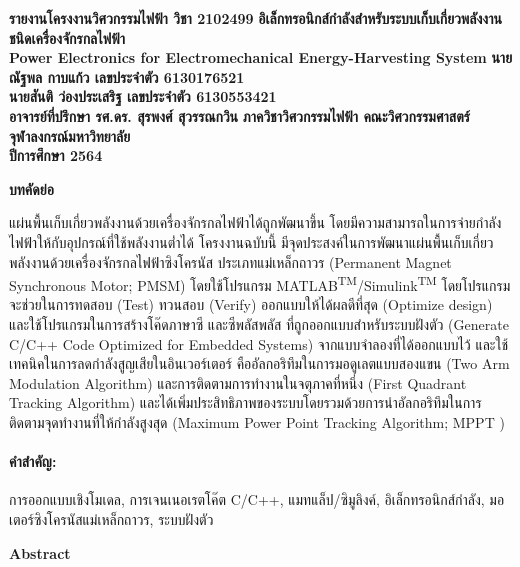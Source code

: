 \documentclass[11pt,a4paper]{article}
\begin{document}
\thispagestyle{empty}
\begin{center}
    \doublespacing
    {\LARGE \bf รายงานโครงงานวิศวกรรมไฟฟ้า วิชา 2102499}
    \vfill
    {
        \LARGE \bf
        อิเล็กทรอนิกส์กำลังสำหรับระบบเก็บเกี่ยวพลังงานชนิดเครื่องจักรกลไฟฟ้า \\[2ex]
        Power Electronics for Electromechanical Energy-Harvesting System
    }
    \vfill
    {\LARGE \bf นายณัฐพล กาบแก้ว เลขประจำตัว 6130176521}\\[2ex]
    {\LARGE \bf นายสันติ ว่องประเสริฐ เลขประจำตัว 6130553421}\\[2ex]
    {\LARGE \bf อาจารย์ที่ปรึกษา รศ.ดร. สุรพงศ์ สุวรรณกวิน}
    \vfill
    {\LARGE \bf ภาควิชาวิศวกรรมไฟฟ้า คณะวิศวกรรมศาสตร์}\\[2ex]
    {\LARGE \bf จุฬาลงกรณ์มหาวิทยาลัย}\\[2ex]
    {\LARGE \bf ปีการศึกษา 2564}
\end{center}

\newpage
\thispagestyle{empty}
\begin{center}
    \textbf{บทคัดย่อ}
\end{center}

แผ่นพื้นเก็บเกี่ยวพลังงานด้วยเครื่องจักรกลไฟฟ้าได้ถูกพัฒนาขึ้น โดยมีความสามารถในการจ่ายกำลังไฟฟ้าให้กับอุปกรณ์ที่ใช้พลังงานต่ำได้ โครงงานฉบับนี้ มีจุดประสงค์ในการพัฒนาแผ่นพื้นเก็บเกี่ยวพลังงานด้วยเครื่องจักรกลไฟฟ้าซิงโครนัส ประเภทแม่เหล็กถาวร (Permanent Magnet Synchronous Motor; PMSM) โดยใช้โปรแกรม MATLAB\textsuperscript{TM}/Simulink\textsuperscript{TM} โดยโปรแกรม จะช่วยในการทดสอบ (Test) ทวนสอบ (Verify) ออกแบบให้ได้ผลดีที่สุด (Optimize design) และใช้โปรแกรมในการสร้างโค๊ดภาษาซี และซีพลัสพลัส ที่ถูกออกแบบสำหรับระบบฝังตัว (Generate C/C++ Code Optimized for Embedded Systems)  จากแบบจำลองที่ได้ออกแบบไว้ และใช้เทคนิคในการลดกำลังสูญเสียในอินเวอร์เตอร์ คืออัลกอริทึมในการมอดูเลตแบบสองแขน (Two Arm Modulation Algorithm) และการติดตามการทำงานในจตุภาคที่หนึ่ง (First Quadrant Tracking Algorithm) และได้เพิ่มประสิทธิภาพของระบบโดยรวมด้วยการนำอัลกอริทึมในการติดตามจุดทำงานที่ให้กำลังสูงสุด (Maximum Power Point Tracking Algorithm; MPPT )

\paragraph{\textbf คำสำคัญ:} การออกแบบเชิงโมเดล, การเจนเนอเรตโค๊ต C/C++, แมทแล็ป/ซิมูลิงค์, อิเล็กทรอนิกส์กำลัง, มอเตอร์ซิงโครนัสแม่เหล็กถาวร, ระบบฝังตัว

\begin{center}
    \textbf{Abstract}
\end{center}
\end{document}
